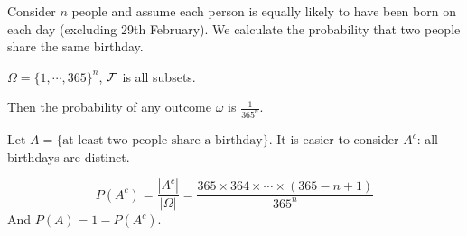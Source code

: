 \documentclass[../Main.tex]{subfiles}
\begin{document}
\begin{example}
    Consider $n$ people and assume each person is equally likely to have been born on each day (excluding 29th February). We calculate the probability that two people share the same birthday.\par
    $\Omega = \{1, \cdots, 365\}^n$, $\mathcal{F}$ is all subsets.\par
    Then the probability of any outcome $\omega$ is $\frac{1}{365^n}$.\par
    Let $A = \{\text{at least two people share a birthday}\}$. It is easier to consider $A^c$: all birthdays are distinct.\par
    \begin{equation*}
        P(A^c) = \frac{|A^c|}{|\Omega|} = \frac{365 \times 364 \times \cdots \times (365-n + 1)}{365^n}
    \end{equation*}
    And $P(A) = 1 - P(A^c)$.
\end{example}
\end{document}
